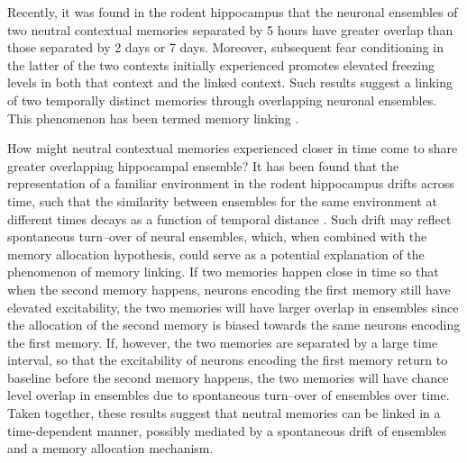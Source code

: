\documentclass[master.tex]{subfiles}
\begin{document}
Recently, it was found in the rodent hippocampus that the neuronal ensembles of
two neutral contextual memories separated by 5 hours have greater overlap than
those separated by 2 days or 7 days. Moreover, subsequent fear conditioning in
the latter of the two contexts initially experienced promotes elevated freezing
levels in both that context and the linked context. Such results suggest a
linking of two temporally distinct memories through overlapping neuronal
ensembles. This phenomenon has been termed memory linking
\cite{cai_shared_2016}.

How might neutral contextual memories experienced closer in time come to share
greater overlapping hippocampal ensemble? It has been found that the
representation of a familiar environment in the rodent hippocampus drifts across
time, such that the similarity between ensembles for the same environment at
different times decays as a function of temporal distance
\cite{mankin_neuronal_2012, ziv_long-term_2013-1}. Such drift may reflect
spontaneous turn--over of neural ensembles, which, when combined with the memory
allocation hypothesis, could serve as a potential explanation of the phenomenon
of memory linking. If two memories happen close in time so that when the second
memory happens, neurons encoding the first memory still have elevated
excitability, the two memories will have larger overlap in ensembles since the
allocation of the second memory is biased towards the same neurons encoding the
first memory. If, however, the two memories are separated by a large time
interval, so that the excitability of neurons encoding the first memory return
to baseline before the second memory happens, the two memories will have chance
level overlap in ensembles due to spontaneous turn--over of ensembles over time.
Taken together, these results suggest that neutral memories can be linked in a
time-dependent manner, possibly mediated by a spontaneous drift of ensembles and
a memory allocation mechanism.
\end{document}
